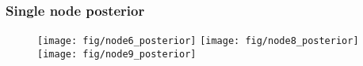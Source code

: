 \documentclass[11pt]{article}
\begin{document}
\subsubsection{Single node posterior}
\begin{figure}[htbp]
\begin{center}
\texttt{[image: fig/node6\_posterior]}%
\texttt{[image: fig/node8\_posterior]}%
\texttt{[image: fig/node9\_posterior]}
\end{center}
\end{figure}



%
%
%
	
\end{document}
